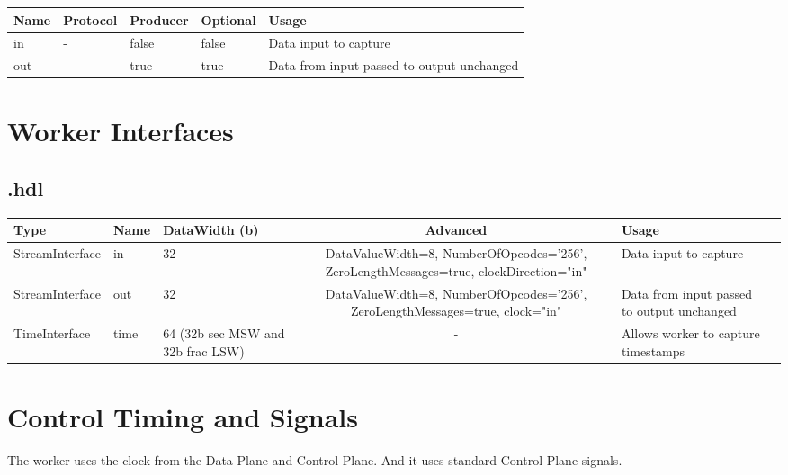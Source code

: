 \begin{landscape}
	\begin{scriptsize}
		\begin{tabular}{|M{2cm}|M{2cm}|M{2cm}|M{3cm}|M{12cm}|}
			\hline
			Name & Protocol & Producer & Optional & Usage\\
			\hline
			in
			& -
			& false
			& false
			& Data input to capture \\
			\hline
			out
			& -
			& true
			& true
			& Data from input passed to output unchanged \\
			\hline
		\end{tabular}
		\end{scriptsize}
\section*{Worker Interfaces}
\subsection*{\comp.hdl}
\begin{scriptsize}
\begin{tabular}{|M{2cm}|M{1.5cm}|M{3cm}|c|M{3.5cm}|M{3.5cm}|}
             \hline
             Type    & Name & DataWidth (b) & Advanced  & Usage     \\
             \hline
             StreamInterface & in   & 32  & DataValueWidth=8, NumberOfOpcodes='256', ZeroLengthMessages=true, clockDirection="in" & Data input to capture \\
            \hline
            StreamInterface & out   & 32  & DataValueWidth=8, NumberOfOpcodes='256', ZeroLengthMessages=true, clock="in"  & Data from input passed to output unchanged \\
            \hline
            TimeInterface & time  & 64 (32b sec MSW and 32b frac LSW) & - & Allows worker to capture timestamps \\
            \hline
\end{tabular}
\end{scriptsize}
\end{landscape}

\section*{Control Timing and Signals}
\begin{flushleft}
The {\comp} worker uses the clock from the Data Plane and Control Plane. And it uses standard Control Plane signals.
\end{flushleft}

